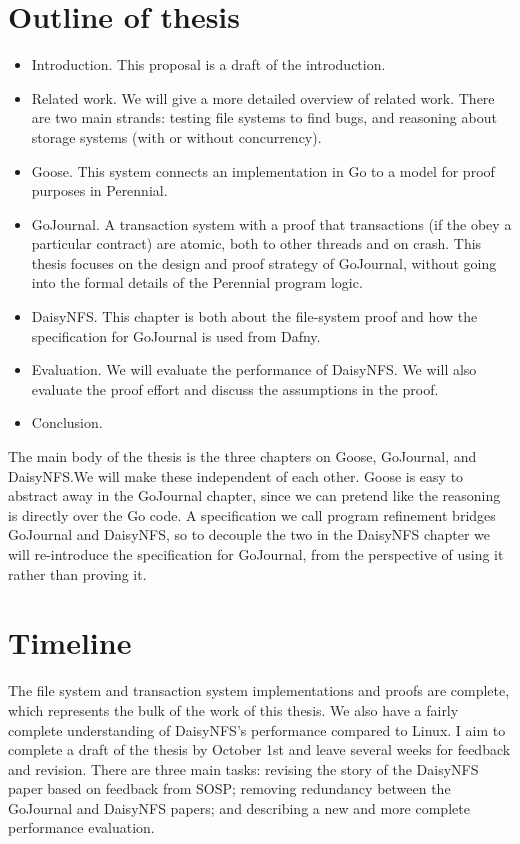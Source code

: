 \section{Outline of thesis}

\begin{itemize}
  \item Introduction. This proposal is a draft of the introduction.
  \item Related work. We will give a more detailed overview of related work.
        There are two main strands: testing file systems to find bugs, and
        reasoning about storage systems (with or without concurrency).
  \item Goose. This system connects an implementation in Go to a model for proof
        purposes in Perennial.
  \item GoJournal. A transaction system with a proof that transactions (if the
        obey a particular contract) are atomic, both to other threads and on
        crash. This thesis focuses on the design and proof strategy of
        GoJournal, without going into the formal details of the Perennial
        program logic.
  \item DaisyNFS. This chapter is both about the file-system proof and how the
        specification for GoJournal is used from Dafny.
  \item Evaluation. We will evaluate the performance of DaisyNFS. We will also
        evaluate the proof effort and discuss the assumptions in the proof.
  \item Conclusion.
\end{itemize}

The main body of the thesis is the three chapters on Goose, GoJournal, and
DaisyNFS.\@ We will make these independent of each other. Goose is easy to
abstract away in the GoJournal chapter, since we can pretend like the reasoning
is directly over the Go code. A specification we call program refinement bridges
GoJournal and DaisyNFS, so to decouple the two in the DaisyNFS chapter we will
re-introduce the specification for GoJournal, from the perspective of using it
rather than proving it.

\section{Timeline}
The file system and transaction system implementations and proofs are complete,
which represents the bulk of the work of this thesis. We also have a fairly
complete understanding of DaisyNFS's performance compared to Linux. I aim to
complete a draft of the thesis by October 1st and leave several weeks for
feedback and revision. There are three main tasks: revising the story of the
DaisyNFS paper based on feedback from SOSP; removing redundancy between the
GoJournal and DaisyNFS papers; and describing a new and more complete
performance evaluation.
